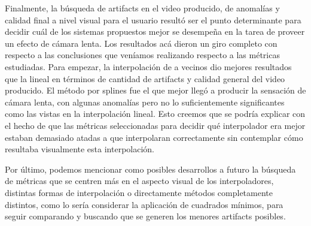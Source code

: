 Finalmente, la búsqueda de artifacts en el video producido, de anomalías y
calidad final a nivel visual para el usuario resultó ser el punto determinante
para decidir cuál de los sistemas propuestos mejor se desempeña en la tarea de
proveer un efecto de cámara lenta. Los resultados acá dieron un giro completo
con respecto a las conclusiones que veníamos realizando respecto a las métricas
estudiadas. Para empezar, la interpolación de a vecinos dio mejores
resultados que la lineal en términos de cantidad de artifacts y calidad general
del video producido. El método por splines fue el que mejor llegó a producir la
sensación de cámara lenta, con algunas anomalías pero no lo suficientemente
significantes como las vistas en la interpolación lineal. Esto creemos que se
podría explicar con el hecho de que las métricas seleccionadas para decidir qué
interpolador era mejor estaban demasiado atadas a que interpolaran
correctamente sin contemplar cómo resultaba visualmente esta interpolación.

Por último, podemos mencionar como posibles desarrollos a futuro la búsqueda de
métricas que se centren más en el aspecto visual de los interpoladores,
distintas formas de interpolación o directamente métodos completamente
distintos, como lo sería considerar la aplicación de cuadrados mínimos, para
seguir comparando y buscando que se generen los menores artifacts posibles.
